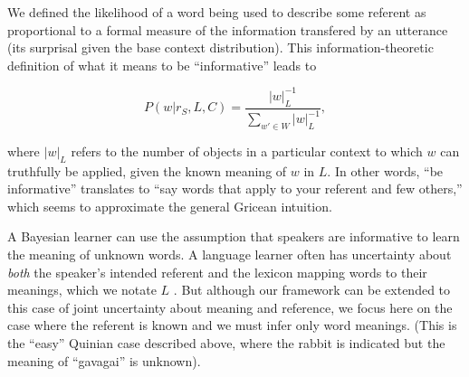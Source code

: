 \documentclass[man,noapacite]{apa2}
\begin{document}
We defined the likelihood of a word being used to describe some referent as proportional to a formal measure of the information transfered by an utterance (its surprisal given the base context distribution). This information-theoretic definition of what it means to be ``informative'' leads to

\begin{equation}
\label{eq:likelihood}
P(w | r_S, L, C) = \frac{|w|_L^{-1}}{\displaystyle \sum_{w' \in W} |w|_L^{-1}},
\end{equation}

\noindent where $|w|_L$ refers to the number of objects in a particular context to which $w$ can truthfully be applied, given the known meaning of $w$ in $L$. In other words, ``be informative'' translates to ``say words that apply to your referent and few others,'' which seems to approximate the general Gricean intuition.


A Bayesian learner can use the assumption that speakers are informative to learn the meaning of unknown words. A language learner often has uncertainty about \emph{both} the speaker's intended referent and the lexicon mapping words to their meanings, which we notate $L$ \cite<a simple version of this case is treated in our work on cross-situational learning in>{frank2009}. But although our framework can be extended to this case of joint uncertainty about meaning and reference, we focus here on the case where the referent is known and we must infer only word meanings. (This is the ``easy'' Quinian case described above, where the rabbit is indicated but the meaning of ``gavagai'' is unknown).
\end{document}

